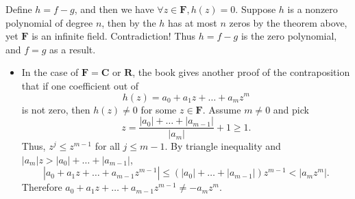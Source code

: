 \documentclass{article}
\newcommand{\R}{\mathbf{R}}
\newcommand{\C}{\mathbf{C}}
\newcommand{\F}{\mathbf{F}}
\begin{document}
\begin{itemize}
    Define $h = f-g$, and then we have $\forall z\in\F, h(z) = 0$. Suppose $h$ is a nonzero polynomial of degree $n$, then by the $h$ has at most $n$ zeros by the theorem above, yet $\F$ is an infinite field. Contradiction! Thus $h = f-g$ is the zero polynomial, and $f = g$ as a result.
    
    \begin{itemize}
        \item In the case of $\F = \C$ or $\R$, the book gives another proof of the contraposition that if one coefficient out of $$h(z) = a_0+a_1z+\dots+a_mz^m$$ is not zero, then $h(z) \not= 0$ for some $z \in \F$. Assume $m \not= 0$ and pick $$z = \frac{|a_0| + \dots + |a_{m-1}|}{|a_m|}+1 \geq 1.$$ Thus, $z^j \leq z^{m-1}$ for all $j \leq m-1$. By triangle inequality and $|a_m|z > |a_0|+ \dots + |a_{m-1}|$, $$|a_0+a_1z+\dots+a_{m-1}z^{m-1}| \leq (|a_0|+\dots+|a_{m-1}|)z^{m-1}< |a_m z^m|.$$ Therefore $a_0+a_1z+\dots+a_{m-1}z^{m-1} \not= -a_m z^m$.
    \end{itemize}
    

\end{itemize}
\end{document}
